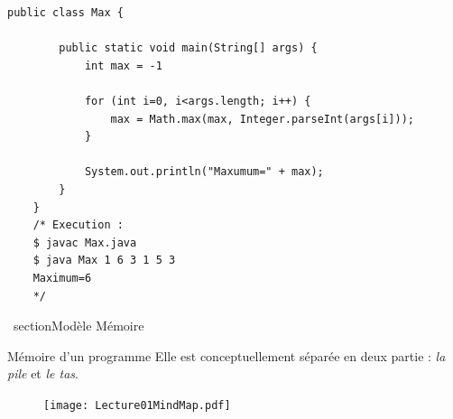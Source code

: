 \documentclass{report}
\begin{document}
\begin{EExample*}{}{}
\begin{lstlisting}[style=JavaDraculaWhite]
	public class Max {

	    public static void main(String[] args) {
			int max = -1
			
			for (int i=0, i<args.length; i++) {
				max = Math.max(max, Integer.parseInt(args[i]));
			}

			System.out.println("Maxumum=" + max);
		}
	}
	/* Execution :
	$ javac Max.java
	$ java Max 1 6 3 1 5 3
	Maximum=6
	*/
\end{lstlisting}
\end{EExample*}
% 
\
section{Modèle Mémoire}
\begin{Concept*}{Mémoire d'un programme}
Elle est conceptuellement séparée en deux partie : \textit{la pile} et \textit{le tas}.
\end{Concept*}
\pagebreak
\begin{figure}[H]
	\texttt{[image: Lecture01MindMap.pdf]}
\end{figure}
\end{document}
